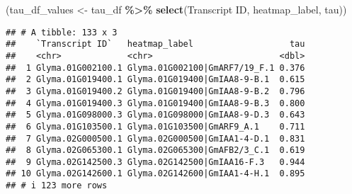 \documentclass[
]{article}
\newenvironment{Shaded}{\begin{snugshade}}{\end{snugshade}}
\newcommand{\AttributeTok}[1]{\textcolor[rgb]{0.13,0.29,0.53}{#1}}
\newcommand{\CommentTok}[1]{\textcolor[rgb]{0.56,0.35,0.01}{\textit{#1}}}
\newcommand{\ControlFlowTok}[1]{\textcolor[rgb]{0.13,0.29,0.53}{\textbf{#1}}}
\newcommand{\DecValTok}[1]{\textcolor[rgb]{0.00,0.00,0.81}{#1}}
\newcommand{\FunctionTok}[1]{\textcolor[rgb]{0.13,0.29,0.53}{\textbf{#1}}}
\newcommand{\NormalTok}[1]{#1}
\newcommand{\OtherTok}[1]{\textcolor[rgb]{0.56,0.35,0.01}{#1}}
\newcommand{\SpecialCharTok}[1]{\textcolor[rgb]{0.81,0.36,0.00}{\textbf{#1}}}
\newcommand{\StringTok}[1]{\textcolor[rgb]{0.31,0.60,0.02}{#1}}
\begin{document}
\begin{Shaded}
\end{Shaded}

\begin{Shaded}
\begin{Highlighting}[]
\NormalTok{(tau\_df\_values }\OtherTok{\textless{}{-}}\NormalTok{ tau\_df }\SpecialCharTok{\%\textgreater{}\%} \FunctionTok{select}\NormalTok{(}\StringTok{\textasciigrave{}}\AttributeTok{Transcript ID}\StringTok{\textasciigrave{}}\NormalTok{, heatmap\_label, tau))}
\end{Highlighting}
\end{Shaded}

\begin{verbatim}
## # A tibble: 133 x 3
##    `Transcript ID`   heatmap_label                   tau
##    <chr>             <chr>                         <dbl>
##  1 Glyma.01G002100.1 Glyma.01G002100|GmARF7/19_F.1 0.376
##  2 Glyma.01G019400.1 Glyma.01G019400|GmIAA8-9-B.1  0.615
##  3 Glyma.01G019400.2 Glyma.01G019400|GmIAA8-9-B.2  0.796
##  4 Glyma.01G019400.3 Glyma.01G019400|GmIAA8-9-B.3  0.800
##  5 Glyma.01G098000.3 Glyma.01G098000|GmIAA8-9-D.3  0.643
##  6 Glyma.01G103500.1 Glyma.01G103500|GmARF9_A.1    0.711
##  7 Glyma.02G000500.1 Glyma.02G000500|GmIAA1-4-D.1  0.831
##  8 Glyma.02G065300.1 Glyma.02G065300|GmAFB2/3_C.1  0.619
##  9 Glyma.02G142500.3 Glyma.02G142500|GmIAA16-F.3   0.944
## 10 Glyma.02G142600.1 Glyma.02G142600|GmIAA1-4-H.1  0.895
## # i 123 more rows
\end{verbatim}
\end{document}
